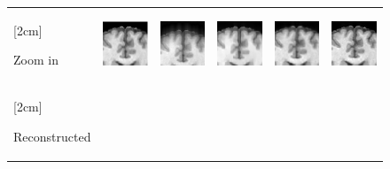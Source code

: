 \documentclass[review]{elsarticle}
\begin{document}
\begin{figure}
\begin{raggedright}
\begin{tabular}{>{\centering}b{0.2cm}lcccc}
				\multirow{1}{0.2cm}[2cm]{\begin{turn}{90}
						{\footnotesize{}Zoom in}
					\end{turn}} & \includegraphics[width=2.5cm]{include/grp1/res1_org_zoom} & \includegraphics[width=2.5cm]{include/grp1/res1_zero_zoom} & \includegraphics[width=2.5cm]{include/grp1/res1_cs_zoom} & \includegraphics[width=2.5cm]{include/grp1/res1_L2_zoom} & \includegraphics[width=2.5cm]{include/grp1/res1_our_zoom}\tabularnewline
					\multirow{1}{0.2cm}[2cm]{\begin{turn}{90}
							{\footnotesize{}Reconstructed}

\end{turn}}
\end{tabular}
\end{raggedright}
\end{figure}
\end{document}
